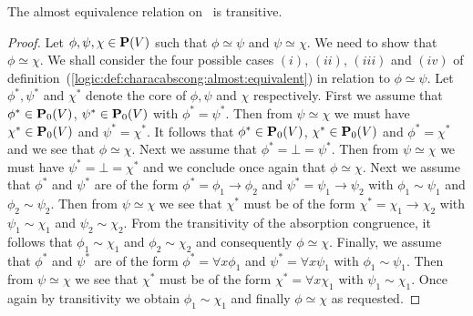 \begin{prop}\label{logic:prop:FOPL:characabscong:almost:transitive}
The almost equivalence relation on \pv\ is transitive.
\end{prop}
\begin{proof}
Let $\phi,\psi,\chi\in\mbox{${\bf P}(V)$}$ such that $\phi\simeq\psi$ and
$\psi\simeq\chi$. We need to show that $\phi\simeq\chi$. We shall
consider the four possible cases $(i)$, $(ii)$, $(iii)$ and $(iv)$
of definition~(\ref{logic:def:characabscong:almost:equivalent}) in
relation to $\phi\simeq\psi$. Let $\phi^{*},\psi^{*}$ and $\chi^{*}$
denote the core of $\phi,\psi$ and $\chi$ respectively. First we
assume that $\phi^{*}\in\mbox{${\bf P}_{0}(V)$}$, $\psi^{*}\in\mbox{${\bf P}_{0}(V)$}$ with
$\phi^{*}=\psi^{*}$. Then from $\psi\simeq\chi$ we must have
$\chi^{*}\in\mbox{${\bf P}_{0}(V)$}$ and $\psi^{*}=\chi^{*}$. It follows that
$\phi^{*}\in\mbox{${\bf P}_{0}(V)$}$, $\chi^{*}\in\mbox{${\bf P}_{0}(V)$}$ and $\phi^{*}=\chi^{*}$ and we
see that $\phi\simeq\chi$. Next we assume that
$\phi^{*}=\bot=\psi^{*}$. Then from $\psi\simeq\chi$ we must have
$\psi^{*}=\bot=\chi^{*}$ and we conclude once again that
$\phi\simeq\chi$. Next we assume that $\phi^{*}$ and $\psi^{*}$ are
of the form $\phi^{*}=\phi_{1}\to\phi_{2}$ and
$\psi^{*}=\psi_{1}\to\psi_{2}$ with $\phi_{1}\sim\psi_{1}$ and
$\phi_{2}\sim\psi_{2}$. Then from $\psi\simeq\chi$ we see that
$\chi^{*}$ must be of the form $\chi^{*}=\chi_{1}\to\chi_{2}$ with
$\psi_{1}\sim\chi_{1}$ and $\psi_{2}\sim\chi_{2}$. From the
transitivity of the absorption congruence, it follows that
$\phi_{1}\sim\chi_{1}$ and $\phi_{2}\sim\chi_{2}$ and consequently
$\phi\simeq\chi$. Finally, we assume that $\phi^{*}$ and $\psi^{*}$
are of the form $\phi^{*}=\forall x\phi_{1}$ and $\psi^{*}=\forall
x\psi_{1}$ with $\phi_{1}\sim\psi_{1}$. Then from $\psi\simeq\chi$
we see that $\chi^{*}$ must be of the form $\chi^{*}=\forall
x\chi_{1}$ with $\psi_{1}\sim\chi_{1}$. Once again by transitivity
we obtain $\phi_{1}\sim\chi_{1}$ and finally $\phi\simeq\chi$ as
requested.
\end{proof}

